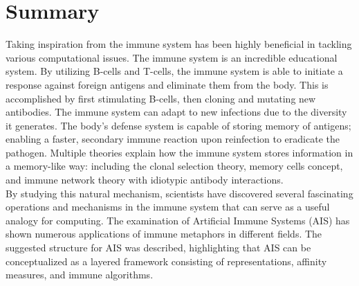 \documentclass{article}
\begin{document}
\section{Summary}
Taking inspiration from the immune system has been highly beneficial in tackling various computational issues. The immune system is an incredible educational system. By utilizing B-cells and T-cells, the immune system is able to initiate a response against foreign antigens and eliminate them from the body. This is accomplished by first stimulating B-cells, then cloning and mutating new antibodies. The immune system can adapt to new infections due to the diversity it generates. The body's defense system is capable of storing memory of antigens; enabling a faster, secondary immune reaction upon reinfection to eradicate the pathogen. Multiple theories explain how the immune system stores information in a memory-like way: including the clonal selection theory, memory cells concept, and immune network theory with idiotypic antibody interactions. \cite{timmis2004overview}\\
By studying this natural mechanism, scientists have discovered several fascinating operations and mechanisms in the immune system that can serve as a useful analogy for computing. The examination of Artificial Immune Systems (AIS) has shown numerous applications of immune metaphors in different fields. The suggested structure for AIS was described, highlighting that AIS can be conceptualized as a layered framework consisting of representations, affinity measures, and immune algorithms. \cite{timmis2004overview}






\end{document}
